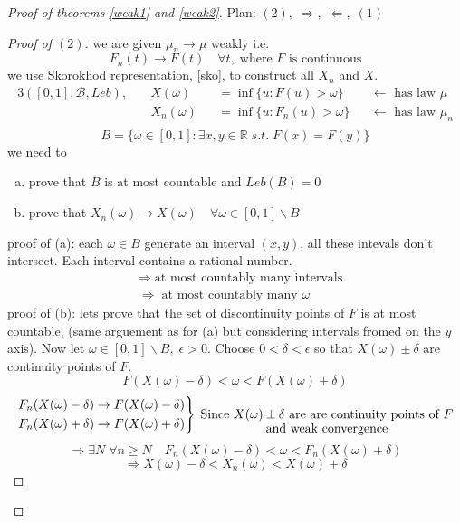 \documentclass[12pt]{article}
\def\RR{\mathbb{R}}
\begin{document}
\begin{proof}[Proof of theorems \ref{weak1} and \ref{weak2}]
Plan: $(2), \; \Rightarrow, \; \Leftarrow,\; (1)$
\begin{proof}[Proof of $(2)$]
we are given $\mu_n \rightarrow \mu$ weakly i.e.
\[F_n(t) \rightarrow F(t) \quad \forall t, \; \text{where $F$ is continuous}\]
we use Skorokhod representation, \ref{sko}, to construct all $X_n$ and $X$.
 \begin{alignat*}{3}
([0,1],\mathcal{B}, Leb), \quad &X(\omega)& &= \inf\{u:F(u)>\omega\}& &\leftarrow \text{ has law }\mu \\
&X_n(\omega)& &=\inf\{u:F_n(u)>\omega\} &  &\leftarrow \text{ has law }\mu_n \\
\end{alignat*}
\[B= \{\omega \in [0,1] : \exists x,y \in \RR\; s.t. \; F(x)=F(y)\}\]
we need to
\begin{enumerate}[(a)]
\item prove that $B$ is at most countable and $Leb(B) = 0$
\item prove that $X_n(\omega) \rightarrow X(\omega) \quad \forall \omega \in [0,1]\backslash B$
\end{enumerate}
proof of (a): each $\omega \in B$ generate an interval $(x,y)$, all these intevals don't intersect. Each interval contains a rational number. \begin{align*}
&\Rightarrow\; \text{at most countably many intervals}\\
&\Rightarrow\; \text{at most countably many }\omega
\end{align*}
proof of (b): lets prove that the set of discontinuity points of $F$ is at most countable, (same arguement as for (a) but considering intervals fromed on the $y$ axis). Now let $\omega \in [0,1]\backslash B, \; \epsilon >0$. Choose $0<\delta<\epsilon$ so that $X(\omega) \pm \delta$ are continuity points of $F$. 
\[F(X(\omega) - \delta) < \omega < F(X(\omega) + \delta) \]
\[\left.\begin{aligned}
       F_n(X(\omega) - \delta) &\rightarrow F(X(\omega) - \delta)\\
        F_n(X(\omega) + \delta) &\rightarrow F(X(\omega) + \delta)
       \end{aligned}
 \right\} \; \underset{\text{\normalsize and weak convergence}}{\text{Since  $X(\omega) \pm \delta$  are are continuity points of $F$}}\]
\[\Rightarrow \exists N\; \forall n\geq N \quad F_n(X(\omega) - \delta) < \omega < F_n(X(\omega) + \delta) \]
\[\Rightarrow X(\omega) - \delta < X_n(\omega) < X(\omega) + \delta\]
\end{proof}


\end{proof}
\end{document}
